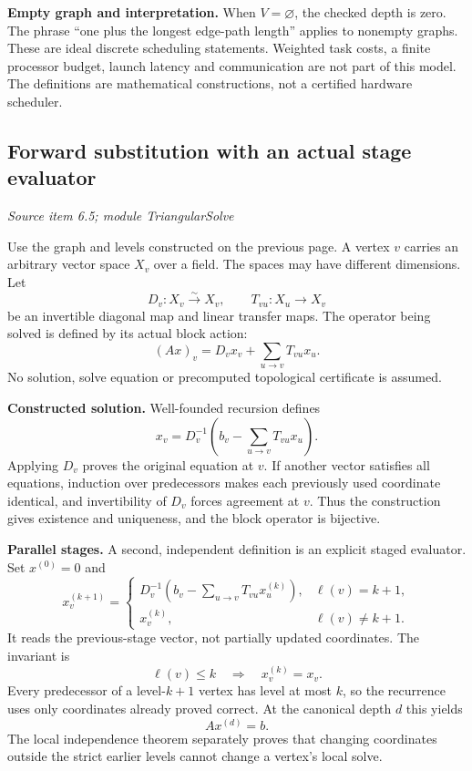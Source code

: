 \textbf{Empty graph and interpretation.} When $V=\varnothing$, the checked depth is zero. The phrase ``one plus the longest edge-path length'' applies to nonempty graphs. These are ideal discrete scheduling statements. Weighted task costs, a finite processor budget, launch latency and communication are not part of this model. The definitions are mathematical constructions, not a certified hardware scheduler.



\subsection{Forward substitution with an actual stage evaluator}\label{supp5:subsection:002}\textit{Source item 6.5; module TriangularSolve}\par
Use the graph and levels constructed on the previous page. A vertex $v$ carries an arbitrary vector space $X_v$ over a field. The spaces may have different dimensions. Let
\[
D_v:X_v\overset{\sim}{\longrightarrow}X_v,
\qquad T_{vu}:X_u\longrightarrow X_v
\]
be an invertible diagonal map and linear transfer maps. The operator being solved is defined by its actual block action:
\[
(Ax)_v=D_vx_v+\sum_{u\to v}T_{vu}x_u.
\]
No solution, solve equation or precomputed topological certificate is assumed.

\textbf{Constructed solution.} Well-founded recursion defines
\[
\boxed{x_v=D_v^{-1}\!\left(b_v-\sum_{u\to v}T_{vu}x_u\right).}
\]
Applying $D_v$ proves the original equation at $v$. If another vector satisfies all equations, induction over predecessors makes each previously used coordinate identical, and invertibility of $D_v$ forces agreement at $v$. Thus the construction gives existence and uniqueness, and the block operator is bijective.

\textbf{Parallel stages.} A second, independent definition is an explicit staged evaluator. Set $x^{(0)}=0$ and
\[
x^{(k+1)}_v=
\begin{cases}
D_v^{-1}\!\left(b_v-\displaystyle\sum_{u\to v}T_{vu}x^{(k)}_u\right),
  &\ell(v)=k+1,\\[5pt]
x^{(k)}_v,&\ell(v)\ne k+1.
\end{cases}
\]
It reads the previous-stage vector, not partially updated coordinates. The invariant is
\[
\ell(v)\leq k\quad\Longrightarrow\quad x^{(k)}_v=x_v.
\]
Every predecessor of a level-$k+1$ vertex has level at most $k$, so the recurrence uses only coordinates already proved correct. At the canonical depth $d$ this yields
\[
\boxed{Ax^{(d)}=b.}
\]
The local independence theorem separately proves that changing coordinates outside the strict earlier levels cannot change a vertex's local solve.


